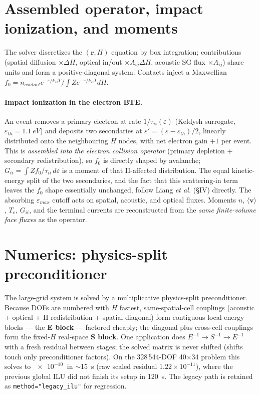 \documentclass[11pt]{article}
\newcommand{\eps}{\varepsilon}
\newcommand{\vecr}{\mathbf{r}}
\begin{document}
\section{Assembled operator, impact ionization, and moments}\label{sec:core}
The solver discretizes the $(\vecr,H)$ equation by box integration; contributions (spatial
diffusion $\times\Delta H$, optical in/out $\times A_{ij}\Delta H$, acoustic SG flux $\times
A_{ij}$) share units and form a positive-diagonal system. Contacts inject a Maxwellian
$f_0=n_{contact}e^{-\eps/k_BT}/\!\int Ze^{-\eps/k_BT}dH$.

\paragraph{Impact ionization in the electron BTE.} An event removes a primary electron at rate
$1/\tau_{ii}(\eps)$ (Keldysh surrogate, $\eps_{th}=\SI{1.1}{eV}$) and deposits two secondaries at
$\eps'=(\eps-\eps_{th})/2$, linearly distributed onto the neighbouring $H$ nodes, with net
electron gain $+1$ per event. This is \emph{assembled into the electron collision operator}
(primary depletion + secondary redistribution), so $f_0$ is directly shaped by avalanche;
$G_{ii}=\int Zf_0/\tau_{ii}\,d\eps$ is a moment of that II-affected distribution. The equal
kinetic-energy split of the two secondaries, and the fact that this scattering-in term leaves the
$f_0$ shape essentially unchanged, follow Liang \emph{et al.} (\S IV) directly. The absorbing
$\eps_{max}$ cutoff acts on spatial, acoustic, and optical fluxes. Moments $n$, $\langle
\mathbf{v}\rangle$, $T_e$, $G_{ii}$, and the terminal currents are reconstructed from the
\emph{same finite-volume face fluxes} as the operator.

\section{Numerics: physics-split preconditioner}\label{sec:numerics}
The large-grid system is solved by a multiplicative physics-split preconditioner. Because DOFs
are numbered with $H$ fastest, same-spatial-cell couplings (acoustic + optical + II
redistribution + spatial diagonal) form contiguous local energy blocks --- the \textbf{E block}
--- factored cheaply; the diagonal plus cross-cell couplings form the fixed-$H$ real-space
\textbf{S block}. One application does $E^{-1}\!\to\!S^{-1}\!\to\!E^{-1}$ with a fresh residual
between stages; the solved matrix is never shifted (shifts touch only preconditioner factors).
On the 328\,544-DOF 40$\times$34 problem this solves to $\SI{e-10}{}$ in $\sim$15~s (raw scaled
residual $1.22\times10^{-11}$), where the previous global ILU did not finish its setup in
120~s. The legacy path is retained as \texttt{method="legacy\_ilu"} for regression.
\end{document}
